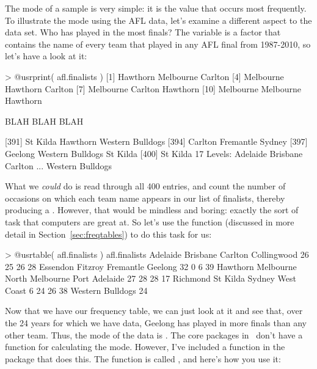   

The mode of a sample is very simple: it is the value that occurs most frequently. To illustrate the mode using the AFL data, let's examine a different aspect to the data set. Who has played in the most finals? The  variable is a factor that contains the name of every team that played in any AFL final from 1987-2010, so let's have a look at it:
\begin{rblock1}
> @usr{print( afl.finalists )}
  [1] Hawthorn         Melbourne        Carlton         
  [4] Melbourne        Hawthorn         Carlton         
  [7] Melbourne        Carlton          Hawthorn        
 [10] Melbourne        Melbourne        Hawthorn              

   BLAH BLAH BLAH

[391] St Kilda         Hawthorn         Western Bulldogs
[394] Carlton          Fremantle        Sydney          
[397] Geelong          Western Bulldogs St Kilda        
[400] St Kilda        
17 Levels: Adelaide Brisbane Carlton ... Western Bulldogs
\end{rblock1}
What we {\it could} do is read through all 400 entries, and count the number of occasions on which each team name appears in our list of finalists, thereby producing a . However, that would be mindless and boring: exactly the sort of task that computers are great at. So let's use the  function (discussed in more detail in Section~\ref{sec:freqtables}) to do this task for us:
\begin{rblock1}
> @usr{table( afl.finalists )}
afl.finalists
        Adelaide         Brisbane          Carlton      Collingwood 
              26               25               26               28 
        Essendon          Fitzroy        Fremantle          Geelong 
              32                0                6               39 
        Hawthorn        Melbourne  North Melbourne    Port Adelaide 
              27               28               28               17 
        Richmond         St Kilda           Sydney       West Coast 
               6               24               26               38 
Western Bulldogs 
              24 
\end{rblock1}
Now that we have our frequency table, we can just look at it and see that, over the 24 years for which we have data, Geelong has played in more finals than any other team. Thus, the mode of the  data is . The core packages in \R\ don't have a function for calculating the mode. However, I've included a function in the  package that does this. The function is called , and here's how you use it:
